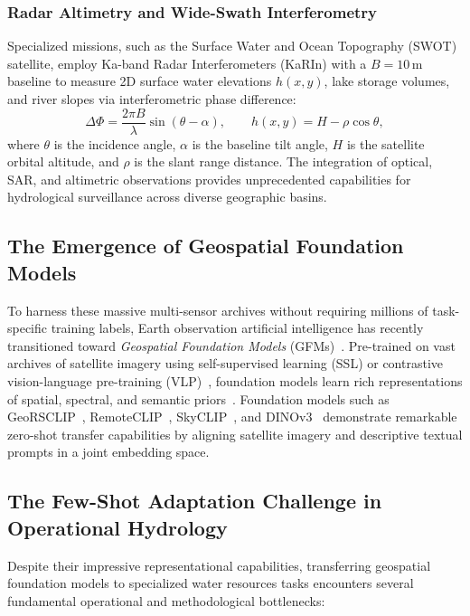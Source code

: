 \subsubsection{Radar Altimetry and Wide-Swath Interferometry}
Specialized missions, such as the Surface Water and Ocean Topography (SWOT) satellite, employ Ka-band Radar Interferometers (KaRIn) with a $B=10$\,m baseline to measure 2D surface water elevations $h(x,y)$, lake storage volumes, and river slopes via interferometric phase difference:
\begin{equation}
    \Delta \Phi = \frac{2\pi B}{\lambda} \sin(\theta - \alpha), \qquad h(x,y) = H - \rho \cos\theta,
\end{equation}
where $\theta$ is the incidence angle, $\alpha$ is the baseline tilt angle, $H$ is the satellite orbital altitude, and $\rho$ is the slant range distance. The integration of optical, SAR, and altimetric observations provides unprecedented capabilities for hydrological surveillance across diverse geographic basins.

\subsection{The Emergence of Geospatial Foundation Models}
To harness these massive multi-sensor archives without requiring millions of task-specific training labels, Earth observation artificial intelligence has recently transitioned toward \emph{Geospatial Foundation Models} (GFMs)~\cite{zhang2024rs5m,simeoni2025dinov3,wang2023remoteclip}. Pre-trained on vast archives of satellite imagery using self-supervised learning (SSL) or contrastive vision-language pre-training (VLP)~\cite{radford2021learning}, foundation models learn rich representations of spatial, spectral, and semantic priors~\cite{congo2023satmae,jakubik2023prithvi,reed2023scalemae,maninis2024seco}. Foundation models such as GeoRSCLIP~\cite{zhang2024rs5m}, RemoteCLIP~\cite{wang2023remoteclip}, SkyCLIP~\cite{mai2023skyclip}, and DINOv3~\cite{simeoni2025dinov3} demonstrate remarkable zero-shot transfer capabilities by aligning satellite imagery and descriptive textual prompts in a joint embedding space.

\subsection{The Few-Shot Adaptation Challenge in Operational Hydrology}
Despite their impressive representational capabilities, transferring geospatial foundation models to specialized water resources tasks encounters several fundamental operational and methodological bottlenecks:

